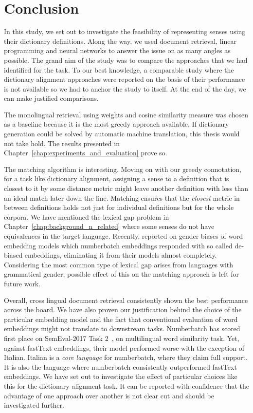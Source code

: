 
\chapter{Conclusion}%
\label{chap:conclusion}

In this study, we set out to investigate the feasibility of representing senses using their dictionary definitions.
Along the way, we used document retrieval, linear programming and neural networks to answer the issue on as many angles as possible.
The grand aim of the study was to compare the approaches that we had identified for the task.
To our best knowledge, a comparable study where the dictionary alignment approaches were reported on the basis of their performance is not available so we had to anchor the study to itself.
At the end of the day, we can make justified comparisons.

The monolingual retrieval using \tfidf weights and cosine similarity measure was chosen as a baseline because it is the most greedy approach available.
If dictionary generation could be solved by automatic machine translation, this thesis would not take hold.
The results presented in Chapter~\ref{chap:experiments_and_evaluation} prove so.

The matching algorithm is interesting.
Moving on with our greedy connotation, for a task like dictionary alignment, assigning a sense to a definition that is closest to it by some distance metric might leave another definition with less than an ideal match later down the line.
Matching ensures that the \emph{closest} metric in between definitions holds not just for individual definitions but for the whole corpora.
We have mentioned the lexical gap problem in Chapter~\ref{chap:background_n_related} where some senses do not have equivalences in the target language.
Recently, \textcite{bolukbasi_man_2016} reported on gender biases of word embedding models which numberbatch embeddings responded with so called de-biased embeddings, eliminating it from their models almost completely.
Considering the most common type of lexical gap arises from languages with grammatical gender, possible effect of this on the matching approach is left for future work.

Overall, cross lingual document retrieval consistently shown the best performance across the board.
We have also proven our justification behind the choice of the particular embedding model and the fact that conventional evaluation of word embeddings might not translate to downstream tasks.
Numberbatch has scored first place on SemEval-2017 Task 2~\cite{camachocollados-EtAl:2017:SemEval}, on multilingual word similarity task.
Yet, against fastText embeddings, their model performed worse with the exception of Italian.
Italian is a \emph{core language} for numberbatch, where they claim full support.
It is also the language where numberbatch consistently outperformed fastText embeddings.
We have set out to investigate the effect of particular choices like this for the dictionary alignment task.
It can be reported with confidence that the advantage of one approach over another is not clear cut and should be investigated further.

